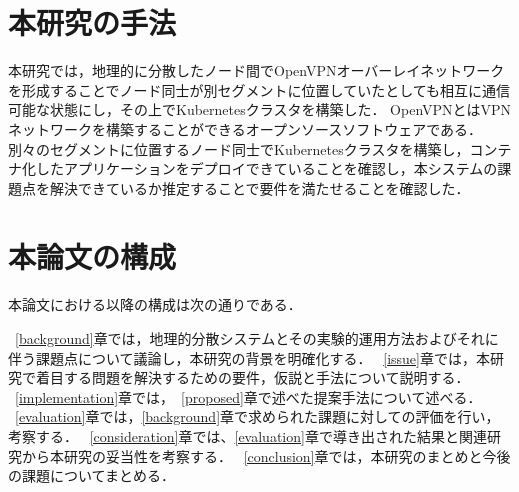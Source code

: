 \section{本研究の手法}
\label{introduction:proposal}
本研究では，地理的に分散したノード間でOpenVPNオーバーレイネットワークを形成することでノード同士が別セグメントに位置していたとしても相互に通信可能な状態にし，その上でKubernetesクラスタを構築した．
OpenVPNとはVPNネットワークを構築することができるオープンソースソフトウェアである．
別々のセグメントに位置するノード同士でKubernetesクラスタを構築し，コンテナ化したアプリケーションをデプロイできていることを確認し，本システムの課題点を解決できているか推定することで要件を満たせることを確認した．


\section{本論文の構成}
\label{introduction:structure}
本論文における以降の構成は次の通りである．

~\ref{background}章では，地理的分散システムとその実験的運用方法およびそれに伴う課題点について議論し，本研究の背景を明確化する．
~\ref{issue}章では，本研究で着目する問題を解決するための要件，仮説と手法について説明する．
~\ref{implementation}章では，~\ref{proposed}章で述べた提案手法について述べる．
~\ref{evaluation}章では，\ref{background}章で求められた課題に対しての評価を行い，考察する．
~\ref{consideration}章では、\ref{evaluation}章で導き出された結果と関連研究から本研究の妥当性を考察する．
~\ref{conclusion}章では，本研究のまとめと今後の課題についてまとめる．


